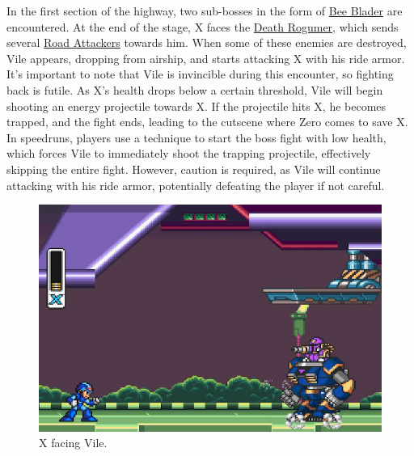 In the first section of the highway, two sub-bosses in the form of \hyperlink{miniboss:Bee_Blader}{Bee Blader} are encountered. At the end of the stage, X faces the \hyperlink{vehicle:Death_Rogumer}{Death Rogumer}, which sends several \hyperlink{enem:Road_Attackers}{Road Attackers} towards him. When some of these enemies are destroyed, Vile appears, dropping from  airship, and starts attacking X with his ride armor. It's important to note that Vile is invincible during this encounter, so fighting back is futile. As X's health drops below a certain threshold, Vile will begin shooting an energy projectile towards X. If the projectile hits X, he becomes trapped, and the fight ends, leading to the cutscene where Zero comes to save X. In speedruns, players use a technique to start the boss fight with low health, which forces Vile to immediately shoot the trapping projectile, effectively skipping the entire fight. However, caution is required, as Vile will continue attacking with his ride armor, potentially defeating the player if not careful.

\begin{figure}[htp]
	\centering
	\includegraphics[width=0.5\linewidth]{figures/X1/Highway_screenshot.jpg}
	\caption{X facing Vile.}
\end{figure}

